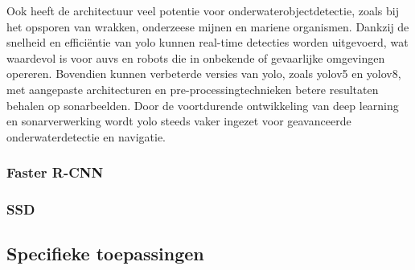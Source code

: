 Ook heeft de architectuur veel potentie voor onderwaterobjectdetectie, zoals bij het opsporen van wrakken, onderzeese mijnen en mariene organismen. Dankzij de snelheid en efficiëntie van \gls{yolo} kunnen real-time detecties worden uitgevoerd, wat waardevol is voor \glspl{auv} en robots die in onbekende of gevaarlijke omgevingen opereren. Bovendien kunnen verbeterde versies van \gls{yolo}, zoals \gls{yolo}v5 en \gls{yolo}v8, met aangepaste architecturen en pre-processingtechnieken betere resultaten behalen op sonarbeelden. Door de voortdurende ontwikkeling van deep learning en sonarverwerking wordt \gls{yolo} steeds vaker ingezet voor geavanceerde onderwaterdetectie en navigatie. \autocite{Chen_2023}

\subsubsection{Faster R-CNN}

\lipsum[1]

\autocite{Ren_2015}
\autocite{Wang_2023}
\autocite{Zeng_2021}
\autocite{Yulin_2020}
\autocite{Chen_2017}

\subsubsection{SSD}

\lipsum[1]

\autocite{Ma_2020}
\autocite{Kumar_2020}
\autocite{Liu_2016}
\autocite{Jiang_2020}

\subsection{Specifieke toepassingen}

\lipsum[1-3]